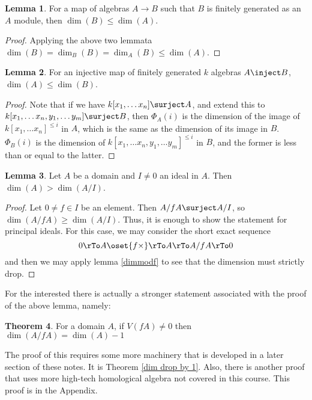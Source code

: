 \documentclass[12 pt]{article}
\theoremstyle{definition}
\newtheorem{thm}{Theorem}[section]
\newtheorem{lemma}[thm]{Lemma}
\renewcommand{\(}{\left(}
\renewcommand{\)}{\right)}
\begin{document}
\begin{lemma} For a map of algebras $A \to B$ such that $B$ is finitely generated as an $A$ module, then $\dim(B) \leq \dim(A)$.
\end{lemma}
\begin{proof} Applying the above two lemmata $\dim(B)=\dim_B(B)=\dim_A(B) \leq \dim(A)$.
\end{proof}




\begin{lemma} For an injective map of finitely generated $k$ algebras $A \inject B$, $\dim(A) \leq \dim(B)$.
\end{lemma}
\begin{proof} Note that if we have $k[x_1, \ldots x_n] \surject A$, and extend this to $k[x_1, \ldots x_n, y_1, \ldots y_m] \surject B$, then $\Phi_A(i)$ is the dimension of the image of $k[x_1, \ldots x_n]^{\leq i}$ in $A$, which is the same as the dimension of its image in $B$. $\Phi_B(i)$ is the dimension of $k[x_1, \ldots x_n, y_1, \ldots y_m]^{\leq i}$ in $B$, and the former is less than or equal to the latter.
\end{proof}


\begin{lemma} Let $A$ be a domain and $I  \neq 0$ an ideal in $A$. Then $\dim(A) > \dim(A/I)$.
\label{hilb dim of quot ring drops}
\end{lemma}
\begin{proof} Let $0 \neq f \in I$ be an element. Then $A/fA \surject A/I$, so $\dim(A/fA) \geq \dim(A/I)$. Thus, it is enough to show the statement for principal ideals. For this case, we may consider the short exact sequence
\[ 0 \rTo A \oset{f \times}\rTo A \rTo A/fA \rTo 0\]
and then we may apply lemma \ref{dimmodf} to see that the dimension must strictly drop.
\end{proof}

For the interested there is actually a stronger statement associated with the proof of the above lemma, namely:

\begin{thm} For a domain $A$, if $V(fA) \neq 0$ then $\dim(A/fA)=\dim(A)-1$
\label{dim drop by 1 v0}
\end{thm}

The proof of this requires some more machinery that is developed in a later section of these notes. It is Theorem \ref{dim drop by 1}. Also, there is another proof that uses more high-tech homological algebra not covered in this course. This proof is in the Appendix.
\end{document}
